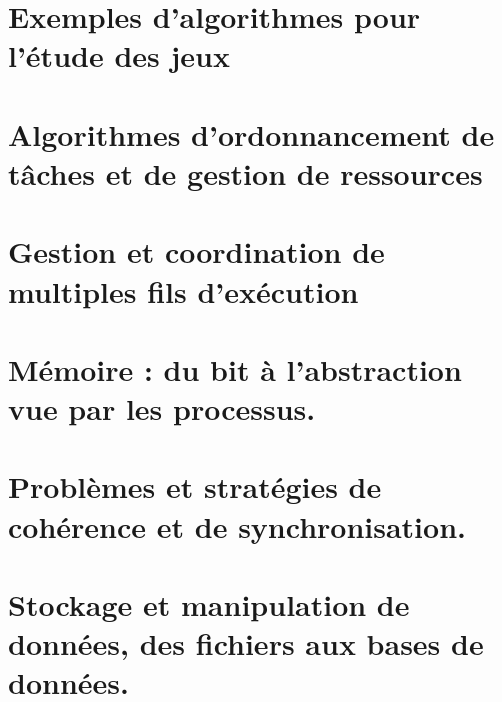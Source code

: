 \chapter{Exemples d'algorithmes pour l'étude des jeux} \label{L16}


\chapter{Algorithmes d'ordonnancement de tâches et de gestion de ressources} \label{L17}


\chapter{Gestion et coordination de multiples fils d'exécution} \label{L18}


\chapter{Mémoire : du bit à l’abstraction vue par les processus.} \label{L19}

\chapter{Problèmes et stratégies de cohérence et de synchronisation.} \label{L20}


\chapter{Stockage et manipulation de données, des fichiers aux bases de données.} \label{L21}


%
 


